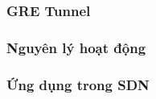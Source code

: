 \subsubsection{GRE Tunnel}

\subsubsection{Nguyên lý hoạt động}

\subsubsection{Ứng dụng trong SDN}
